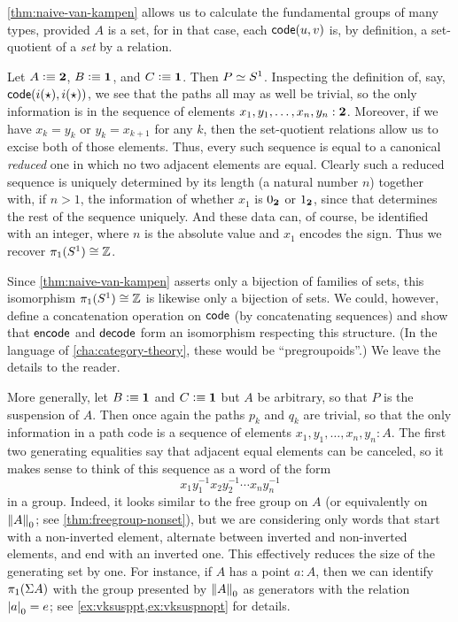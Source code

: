 %

\cref{thm:naive-van-kampen} allows us to calculate the fundamental groups of many types, provided $A$ is a set,
for in that case, each $\code(u,v)$ is, by definition, a set-quotient of a \emph{set} by a relation.

\begin{eg}\label{eg:circle}
  Let $A\defeq \bool$, $B\defeq\unit$, and $C\defeq \unit$.
  Then $P \eqvsym S^1$.
  Inspecting the definition of, say, $\code(i(\ttt),i(\ttt))$, we see that the paths all may as well be trivial, so the only information is in the sequence of elements $x_1,y_1,\dots,x_n,y_n: \bool$.
  Moreover, if we have $x_k=y_k$ or $y_k=x_{k+1}$ for any $k$, then the set-quotient relations allow us to excise both of those elements.
  Thus, every such sequence is equal to a canonical \emph{reduced} one in which no two adjacent elements are equal.
  Clearly such a reduced sequence is uniquely determined by its length (a natural number $n$) together with, if $n>1$, the information of whether $x_1$ is $\bfalse$ or $\btrue$, since that determines the rest of the sequence uniquely.
  And these data can, of course, be identified with an integer, where $n$ is the absolute value and $x_1$ encodes the sign.
  Thus we recover $\pi_1(S^1)\cong \Z$.
\end{eg}

Since \cref{thm:naive-van-kampen} asserts only a bijection of families of sets, this isomorphism $\pi_1(S^1)\cong \Z$ is likewise only a bijection of sets.
We could, however, define a concatenation operation on $\code$ (by concatenating sequences) and show that $\encode$ and $\decode$ form an isomorphism respecting this structure.
(In the language of \cref{cha:category-theory}, these would be ``pregroupoids''.)
We leave the details to the reader.

%

\begin{eg}\label{eg:suspension}
  More generally, let $B\defeq\unit$ and $C\defeq \unit$ but $A$ be arbitrary, so that $P$ is the suspension of $A$.
  Then once again the paths $p_k$ and $q_k$ are trivial, so that the only information in a path code is a sequence of elements $x_1,y_1,\dots,x_n,y_n: A$.
  The first two generating equalities say that adjacent equal elements can be canceled, so it makes sense to think of this sequence as a word of the form
  \[ x_1 y_1^{-1} x_2 y_2^{-1} \cdots x_n y_n^{-1} \]
  in a group.
  Indeed, it looks similar to the free group on $A$ (or equivalently on $\trunc0A$; see \cref{thm:freegroup-nonset}), but we are considering only words that start with a non-inverted element, alternate between inverted and non-inverted elements, and end with an inverted one.
  This effectively reduces the size of the generating set by one.
  For instance, if $A$ has a point $a:A$, then we can identify $\pi_1(\susp A)$ with the group presented by $\trunc0A$ as generators with the relation $\tproj0a = e$; see \cref{ex:vksusppt,ex:vksuspnopt} for details.
\end{eg}

